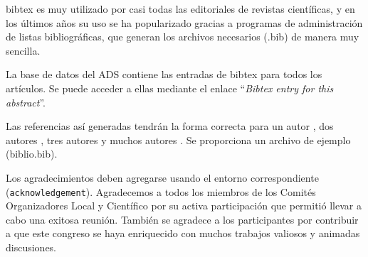 \documentclass[baaa]{baaa}
\begin{document}
{\sc bibtex} es muy utilizado por casi todas las editoriales de revistas
científicas, y en los últimos años su uso se ha popularizado gracias a
programas de administración de listas bibliográficas, que generan los
archivos necesarios (.bib) de manera muy sencilla.

La base de datos del ADS contiene las entradas de {\sc bibtex}  para todos
los artículos.  Se puede acceder a ellas mediante el enlace ``{\em Bibtex
entry for this abstract}''.

Las referencias así generadas tendrán la forma co\-rrec\-ta
para un autor \citep{hubble_expansion_1929}, dos autores
\citep{penzias_cmb_1965}, tres autores \citep{navarro_NFW_1997} y
muchos autores \citep{riess_SN1a_1998}.
Se proporciona un archivo de ejemplo (biblio.bib).


\begin{acknowledgement}
Los agradecimientos deben agregarse usando el entorno correspondiente
(\texttt{acknowledgement}).
Agradecemos a todos los miembros de los Comités Organizadores Local y 
Científico por su activa
participación que permitió llevar a cabo una exitosa reunión. También
se agradece a los participantes por contribuir a que este congreso se haya
enriquecido con muchos trabajos valiosos y animadas discusiones.
\end{acknowledgement}




\small

 
\end{document}
